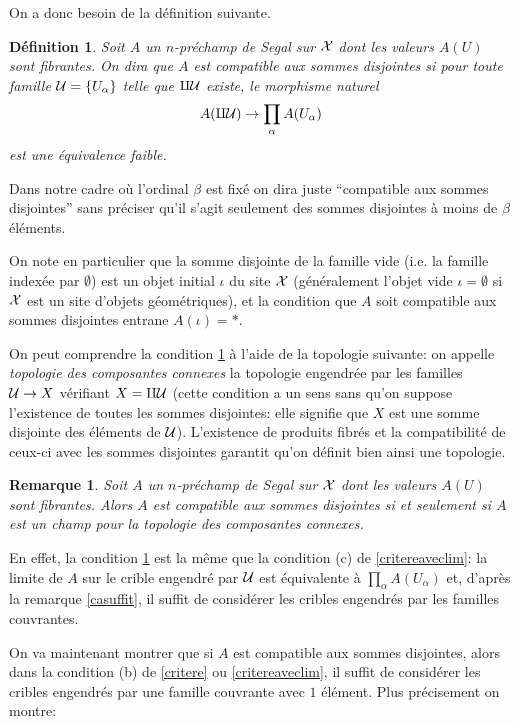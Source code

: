 \documentclass[12pt]{article}
\newtheorem{definition}[lemma]{D\'efinition}
\newtheorem{remarque}[lemma]{Remarque}
\newcommand{\Uu}{{\cal U}}
\newcommand{\Xx}{{\cal X}}
\begin{document}
On a donc besoin de la d\'efinition suivante.

\begin{definition}
\label{compsomdis}
Soit $A$ un $n$-pr\'echamp de Segal sur $\Xx$
dont les valeurs $A(U)$ sont fibrantes.
On dira que {\em $A$ est compatible aux sommes disjointes} si pour toute famille
$\Uu = \{ U_{\alpha} \}$ telle que $\amalg \Uu$ existe, le morphisme naturel
$$
A(\amalg \Uu )\rightarrow \prod _{\alpha} A(U_{\alpha})
$$
est une \'equivalence faible.
\end{definition}

Dans notre cadre o\`u l'ordinal $\beta$ est fix\'e on dira juste ``compatible
aux sommes disjointes'' sans pr\'eciser qu'il s'agit seulement des sommes
disjointes \`a moins de $\beta$ \'el\'ements.

On note en particulier que la somme disjointe de la famille vide (i.e. la
famille index\'ee  par $\emptyset$) est un objet initial $\iota$ du site
$\Xx$ (g\'en\'eralement l'objet vide $\iota = \emptyset$ si $\Xx$ est un site
d'objets g\'eom\'etriques), et la  condition que $A$ soit compatible aux sommes
disjointes entra\*{\i}ne $A(\iota )= \ast$.

On peut comprendre la condition \ref{compsomdis} \`a l'aide de la topologie
suivante: on appelle {\em topologie des composantes connexes} la topologie
engendr\'ee par les familles  $\Uu \rightarrow X$ v\'erifiant $X=\amalg \Uu$
(cette condition a un sens sans qu'on suppose l'existence de toutes les sommes
disjointes: elle signifie que $X$ est une somme disjointe des
\'el\'ements de $\Uu$). L'existence de produits fibr\'es et
la compatibilit\'e de
ceux-ci avec les sommes disjointes garantit qu'on d\'efinit bien
ainsi une topologie.

\begin{remarque}
\label{topcompcon}
Soit $A$ un $n$-pr\'echamp de Segal sur $\Xx$ dont les valeurs $A(U)$
sont fibrantes.
Alors $A$ est compatible aux sommes disjointes si et seulement si $A$ est un
champ pour la topologie des composantes connexes.
\end{remarque}

En effet, la condition \ref{compsomdis} est la m\^eme que la condition (c) de
\ref{critereaveclim}: la limite de $A$ sur le crible engendr\'e par $\Uu$
est \'equivalente \`a $\prod _{\alpha} A(U_{\alpha})$ et, d'apr\`es la remarque
\ref{casuffit}, il suffit de consid\'erer les cribles engendr\'es par les
familles couvrantes.

On va maintenant
montrer que si $A$ est compatible aux sommes disjointes, alors dans la
condition (b) de
\ref{critere} ou \ref{critereaveclim}, il suffit de consid\'erer les cribles
engendr\'es par une famille couvrante avec $1$ \'el\'ement.
Plus pr\'ecisement on montre:
\end{document}
